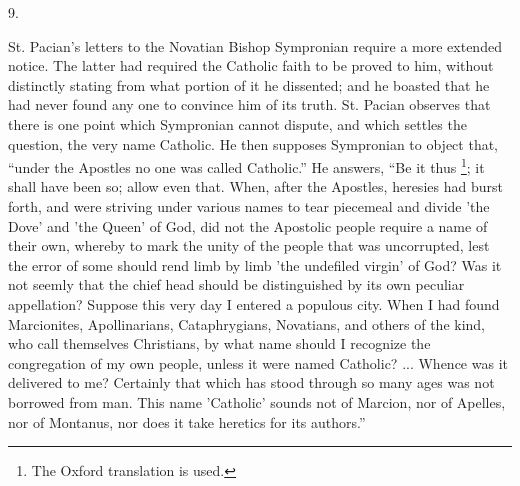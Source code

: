 9.

St. Pacian's letters to the Novatian Bishop Sympronian
require a more extended notice. The latter had required
the Catholic faith to be proved to him, without
distinctly stating from what portion of it he dissented;
and he boasted that he had never found any one to
convince him of its truth. St. Pacian observes that there
is one point which Sympronian cannot dispute, and which
settles the question, the very name Catholic. He then
supposes Sympronian to object that, ``under the
Apostles no one was called Catholic.'' He answers,
``Be it thus \footnote{The Oxford translation is
used.}; it shall have been so;
allow even that. When, after the Apostles, heresies had
burst forth, and were striving under various names to
tear piecemeal and divide 'the Dove' and 'the Queen' of
God, did not the Apostolic people require a name of their
own, whereby to mark the unity of the people that was
uncorrupted, lest the error of some should rend limb by
limb 'the undefiled virgin' of God? Was it not seemly
that the chief head should be distinguished by its own
peculiar appellation? Suppose this very day I entered a populous city. When I had found Marcionites,
Apollinarians, Cataphrygians, Novatians, and others of
the kind, who call themselves Christians, by what name
should I recognize the congregation of my own people,
unless it were named Catholic? ... Whence was it
delivered to me? Certainly that which has stood through
so many ages was not borrowed from man. This name
'Catholic' sounds not of Marcion, nor of Apelles, nor of
Montanus, nor does it take heretics for its
authors.''

